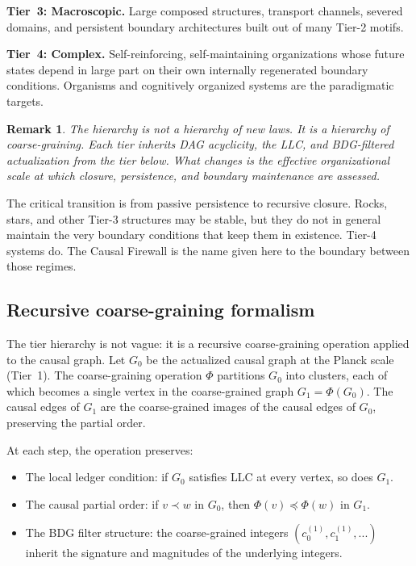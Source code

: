 \documentclass[11pt]{article}
\def\ldots{...}%
\newtheorem{remark}{Remark}
\begin{document}
\textbf{Tier~3: Macroscopic.} Large composed structures, transport channels, severed domains, and persistent boundary architectures built out of many Tier-2 motifs.

\textbf{Tier~4: Complex.} Self-reinforcing, self-maintaining organizations whose future states depend in large part on their own internally regenerated boundary conditions. Organisms and cognitively organized systems are the paradigmatic targets.

\begin{remark}
The hierarchy is not a hierarchy of new laws. It is a hierarchy of coarse-graining. Each tier inherits DAG acyclicity, the LLC, and BDG-filtered actualization from the tier below. What changes is the effective organizational scale at which closure, persistence, and boundary maintenance are assessed.
\end{remark}

The critical transition is from passive persistence to recursive closure. Rocks, stars, and other Tier-3 structures may be stable, but they do not in general maintain the very boundary conditions that keep them in existence. Tier-4 systems do. The Causal Firewall is the name given here to the boundary between those regimes.

\subsection{Recursive coarse-graining formalism}
\label{sec:coarse_grain}

The tier hierarchy is not vague: it is a recursive coarse-graining operation applied to the causal graph. Let $G_0$ be the actualized causal graph at the Planck scale (Tier~1). The coarse-graining operation $\Phi$ partitions $G_0$ into clusters, each of which becomes a single vertex in the coarse-grained graph $G_1 = \Phi(G_0)$. The causal edges of $G_1$ are the coarse-grained images of the causal edges of $G_0$, preserving the partial order.

At each step, the operation preserves:
\begin{itemize}[nosep]
\item The local ledger condition: if $G_0$ satisfies LLC at every vertex, so does $G_1$.
\item The causal partial order: if $v \prec w$ in $G_0$, then $\Phi(v) \preceq \Phi(w)$ in $G_1$.
\item The BDG filter structure: the coarse-grained integers $(c_0^{(1)}, c_1^{(1)}, \ldots)$ inherit the signature and magnitudes of the underlying integers.
\end{itemize}
\end{document}

